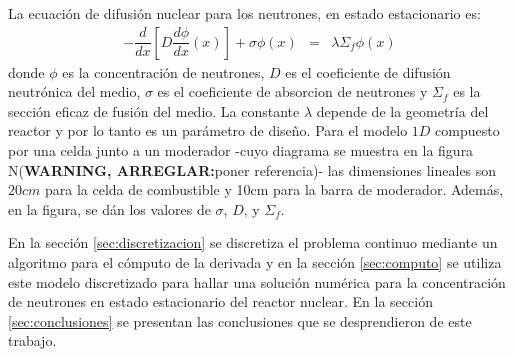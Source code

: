 \documentclass[11pt,a4paper]{emulateapj}
\def \warn {{\sffamily\bfseries\large WARNING, ARREGLAR:}}
\begin{document}
La ecuación de difusión nuclear para los neutrones, en estado estacionario es:
\begin{eqnarray}
\label{eq:ecuacionADiscretizar}
  -\dfrac{d}{dx}[D \dfrac{d\phi}{dx}(x)] + \sigma \phi(x)  &=& \lambda  \Sigma_f \phi(x)
\end{eqnarray}
donde $\phi$ es la concentración de neutrones, $D$ es el coeficiente de difusión neutrónica del
medio, $\sigma$ es el coeficiente de absorcion de neutrones y $\Sigma_f$ es la sección eficaz de fusión del
medio. La constante $\lambda$ depende de la geometría del reactor y por lo tanto es un parámetro
de diseño.
Para el modelo $1D$ compuesto por una celda junto a un moderador 
-cuyo diagrama se muestra en la figura N(\warn poner referencia)- las dimensiones 
lineales son $20cm$ para la celda de combustible y 10cm para la barra de moderador.
Además, en la figura, se dán los valores de $\sigma$, $D$, y $\Sigma_f$.


En la sección \ref{sec:discretizacion} se discretiza
el problema continuo mediante un algoritmo para el cómputo de la derivada y en la sección \ref{sec:computo} 
se utiliza este modelo discretizado para hallar una solución numérica para la concentración de neutrones
en estado estacionario del reactor nuclear. En la sección \ref{sec:conclusiones} se presentan las conclusiones
que se desprendieron de este trabajo.
\end{document}
